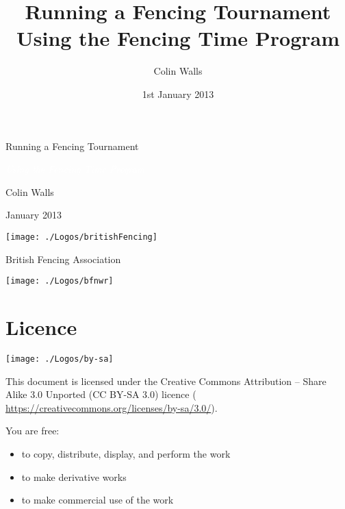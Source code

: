 \documentclass[a4paper,11pt]{memoir}
\title{Running a Fencing Tournament Using the Fencing Time Program}
\author{Colin Walls}
\date{1st January 2013}
\begin{document}
\frontmatter %

\begin{titlingpage}
\newlength{\drop}
\begin{center}
\textheight
{}\baselineskip
\sffamily
\vspace*{\drop}
\centering
{\textcolor{nicered}{\HUGE Running a Fencing Tournament}}\par
\vspace{0.5\drop}
\colorbox{Dark}{\textcolor{white}{\normalfont\itshape\Large
Using the Fencing Time Program}}\par
\vspace{\drop}
{\Large Colin Walls}\par
\vfill
{\Large January 2013}\par
\vfill
\texttt{[image: ./Logos/britishFencing]}
\par
{\footnotesize British Fencing Association}\par
\vspace*{\drop}
\texttt{[image: ./Logos/bfnwr]}
\vfill
\end{center}
\end{titlingpage}

\newcommand{\fencingtime}{\emph{{\color{nicered}{Fencing Time}}}}

\newcommand\button[2][]{\tikz[overlay]\node[fill=blue!20,inner sep=2pt, anchor=text, rectangle, rounded corners=1mm,#1] {#2};\phantom{#2}}

\newcommand\menu[2][]{\tikz[overlay]\node[fill=gray!20,inner sep=2pt, anchor=text, rectangle ,#1] {#2};\phantom{#2}}

\section*{Licence}
\begin{center}
\texttt{[image: ./Logos/by-sa]} 
\end{center}

This document is licensed under the Creative Commons Attribution -- Share Alike 3.0 Unported (CC BY-SA 3.0) licence (
\url{https://creativecommons.org/licenses/by-sa/3.0/}).

You are free:

\begin{itemize}
 \item to copy, distribute, display, and perform the work
 \item to make derivative works
 \item to make commercial use of the work
\end{itemize}
\end{document}
